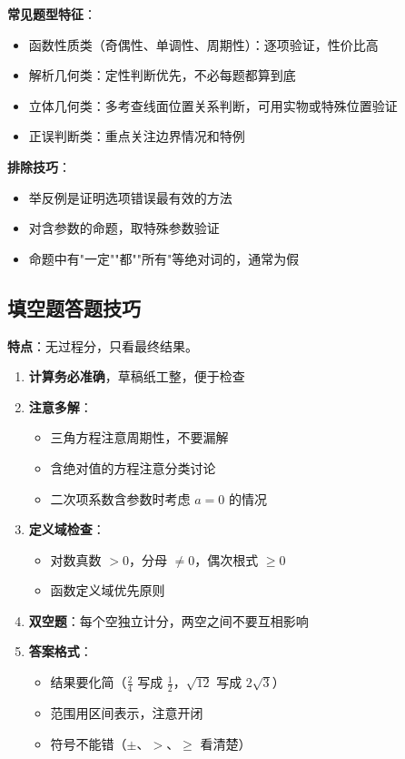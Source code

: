 \textbf{常见题型特征}：
\begin{itemize}
  \item 函数性质类（奇偶性、单调性、周期性）：逐项验证，性价比高
  \item 解析几何类：定性判断优先，不必每题都算到底
  \item 立体几何类：多考查线面位置关系判断，可用实物或特殊位置验证
  \item 正误判断类：重点关注边界情况和特例
\end{itemize}

\textbf{排除技巧}：
\begin{itemize}
  \item 举反例是证明选项错误最有效的方法
  \item 对含参数的命题，取特殊参数验证
  \item 命题中有"一定""都""所有"等绝对词的，通常为假
\end{itemize}

\subsection{填空题答题技巧}

\textbf{特点}：无过程分，只看最终结果。

\begin{enumerate}
  \item \textbf{计算务必准确}，草稿纸工整，便于检查
  \item \textbf{注意多解}：
    \begin{itemize}
      \item 三角方程注意周期性，不要漏解
      \item 含绝对值的方程注意分类讨论
      \item 二次项系数含参数时考虑 $a=0$ 的情况
    \end{itemize}
  \item \textbf{定义域检查}：
    \begin{itemize}
      \item 对数真数 $>0$，分母 $\neq 0$，偶次根式 $\ge 0$
      \item 函数定义域优先原则
    \end{itemize}
  \item \textbf{双空题}：每个空独立计分，两空之间不要互相影响
  \item \textbf{答案格式}：
    \begin{itemize}
      \item 结果要化简（$\frac{2}{4}$ 写成 $\frac12$，$\sqrt{12}$ 写成 $2\sqrt{3}$）
      \item 范围用区间表示，注意开闭
      \item 符号不能错（$\pm$、$>$、$\ge$ 看清楚）
    \end{itemize}
\end{enumerate}

